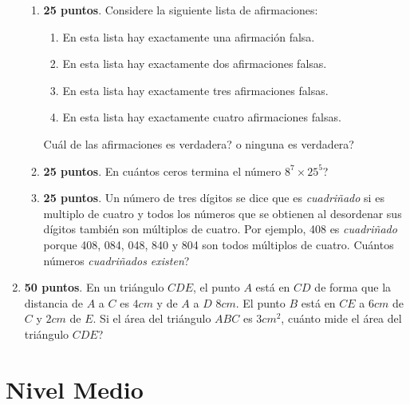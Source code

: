 \begin{enumerate}
\begin{enumerate}[label=\Alph*)]
	\item \textbf{25 puntos}. Considere la siguiente lista de afirmaciones:
			\begin{enumerate}
			\item En esta lista hay exactamente una afirmación falsa.
			\item En esta lista hay exactamente dos afirmaciones falsas.
			\item En esta lista hay exactamente tres afirmaciones falsas.
			\item En esta lista hay exactamente cuatro afirmaciones falsas.			
			\end{enumerate}
			Cuál de las afirmaciones es verdadera? o ninguna es verdadera? 
			
	\item \textbf{25 puntos}. En cuántos ceros termina el número $8^7\times 25^5$?
	
	\item \textbf{25 puntos}. Un número de tres dígitos se dice que es \textit{cuadriñado} si es multiplo de cuatro y todos los números que se obtienen al desordenar sus dígitos también son múltiplos de cuatro. Por ejemplo, 408 es \textit{cuadriñado} porque 408, 084, 048, 840 y 804 son todos múltiplos de cuatro. Cuántos números \textit{cuadriñados existen}?
	\end{enumerate}

\item \textbf{50 puntos}. En un triángulo $CDE$, el punto $A$ está en $CD$ de forma que la distancia de $A$ a $C$ es $4cm$ y de $A$ a $D$ $8cm$. El punto $B$ está en $CE$ a $6cm$ de $C$ y $2cm$ de $E$. Si el área del triángulo $ABC$ es $3{cm}^2$, cuánto mide el área del triángulo $CDE$?


\end{enumerate}


\newpage
\section{Nivel Medio}\label{MEDIO_2020_13_junio}

